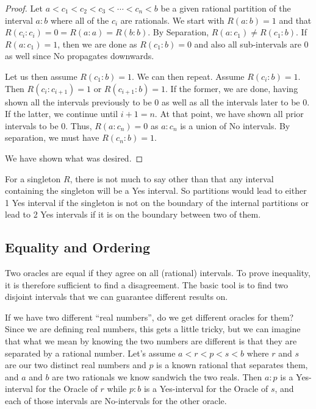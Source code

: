 \documentclass[12pt]{article}
\theoremstyle{remark}
\begin{document}
\begin{proof}
Let $a < c_1 < c_2 < c_3 < \cdots < c_n < b$ be a given rational partition of the interval $a:b$ where all of the $c_i$ are rationals. We start with $R(a:b) = 1$ and that $R(c_i:c_i) = 0 = R(a:a) = R(b:b)$. By Separation, $R(a:c_1) \neq R(c_1:b)$. If $R(a:c_1)=1$, then we are done as $R(c_1:b)=0$ and also all sub-intervals are 0 as well since No propagates downwards. 

Let us then assume $R(c_1:b)=1$. We can then repeat. Assume $R(c_i:b)=1$. Then $R(c_i:c_{i+1})=1$ or $R(c_{i+1}:b)=1$. If the former, we are done, having shown all the intervals previously to be 0 as well as all the intervals later to be 0.  If the latter, we continue until $i+1 = n$. At that point, we have shown all prior intervals to be 0. Thus, $R(a:c_n)=0$ as $a:c_{n}$ is a union of No intervals. By separation, we must have $R(c_n:b) = 1$. 

We have shown what was desired. 
\end{proof}

For a singleton $R$, there is not much to say other than that any interval containing the singleton will be a Yes interval. So partitions would lead to either 1 Yes interval if the singleton is not on the boundary of the internal partitions or lead to 2 Yes intervals if it is on the boundary between two of them. 

\subsection{Equality and Ordering}

Two oracles are equal if they agree on all (rational) intervals. To prove inequality, it is therefore sufficient to find a disagreement. The basic tool is to find two disjoint intervals that we can guarantee different results on. 

If we have two different ``real numbers'', do we get different oracles for them? Since we are defining real numbers, this gets a little tricky, but we can imagine that what we mean by knowing the two numbers are different is that they are separated by a rational number. Let's assume $a < r < p < s < b$ where $r$ and $s$ are our two distinct real numbers and $p$ is a known rational that separates them, and $a$ and $b$ are two rationals we know sandwich the two reals. Then $a:p$ is a Yes-interval for the Oracle of $r$ while $p:b$ is a Yes-interval for the Oracle of $s$, and each of those intervals are No-intervals for the other oracle. 
\end{document}
